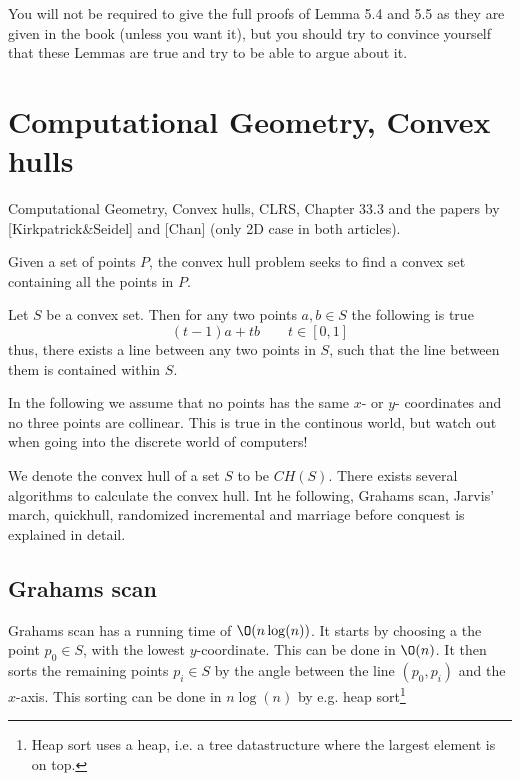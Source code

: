 \documentclass[10pt]{article}
\begin{document}
You will not be required to give the full proofs of Lemma 5.4 and 5.5 as they are given in the book (unless you want it), but you should try to convince yourself that these Lemmas are true and try to be able to argue about it. 




\section{Computational Geometry, Convex hulls} %
\label{sec:computational_geometry_convex_hulls}
Computational Geometry, Convex  hulls, CLRS,  Chapter 33.3 and the papers by [Kirkpatrick\&Seidel] and [Chan] (only 2D case in both articles).

Given a set of points $P$, the convex hull problem seeks to find a convex set containing all the points in $P$.

Let $S$ be a convex set. Then for any two points $a,b \in S$ the following is true
\begin{equation}
  (t-1)a+tb \qquad t \in [0,1]
\end{equation}
thus, there exists a line between any two points in $S$, such that the line between them is contained within $S$.

In the following we assume that no points has the same $x$- or $y$- coordinates and no three points are collinear. This is true in the continous world, but watch out when going into the discrete world of computers!

We denote the convex hull of a set $S$ to be $CH(S)$. There exists several algorithms to calculate the convex hull. Int he following, Grahams scan, Jarvis' march, quickhull, randomized incremental and marriage before conquest is explained in detail.

\subsection{Grahams scan} %
\label{sub:grahams_scan}
Grahams scan has a running time of $\O(n\log(n))$. It starts by choosing a the point $p_0 \in S$, with the lowest $y$-coordinate. This can be done in $\O(n)$. It then sorts the remaining points $p_i \in S$ by the angle between the line $(p_0, p_i)$ and the $x$-axis. This sorting can be done in $n \log(n)$ by e.g. heap sort\footnote{Heap sort uses a heap, i.e. a tree datastructure where the largest element is on top.} 
\end{document}
